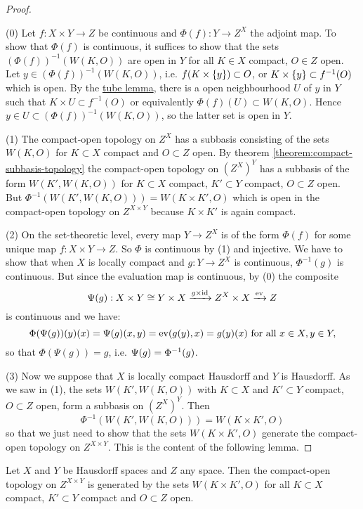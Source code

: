 \begin{proof}\ 

(0) Let $f:X\times Y\to Z$ be continuous and $\Phi(f):Y\to Z^X$ the adjoint map. To show that $\Phi(f)$ is continuous, it suffices to show that the sets $(\Phi(f))^{-1}(W(K,O))$ are open in $Y$ for all $K\in X$ compact, $O\in Z$ open. Let $y\in (\Phi(f))^{-1}(W(K,O))$, i.e. $f(K\times\{y\})\subset O$, or $K\times\{y\}\subset f^{-1}(O)$ which is open. By the \href{https://en.wikipedia.org/wiki/Tube_lemma}{tube lemma}, there is a open neighbourhood $U$ of $y$ in $Y$ such that $K\times U\subset f^{-1}(O)$ or equivalently $\Phi(f)(U)\subset W(K,O)$. Hence $y\in U\subset(\Phi(f))^{-1}(W(K,O))$, so the latter set is open in $Y$.

(1) The compact-open topology on $Z^X$ has a subbasis consisting of the sets $W(K,O)$ for $K\subset X$ compact and $O\subset Z$ open. By theorem \ref{theorem:compact-subbasis-topology} the compact-open topology on $(Z^X)^Y$ has a subbasis of the form $W(K',W(K,O))$ for $K\subset X$ compact, $K'\subset Y$ compact, $O\subset Z$ open. But $\Phi^{-1}(W(K',W(K,O)))=W(K\times K',O)$ which is open in the compact-open topology on $Z^{X\times Y}$ because $K\times K'$ is again compact.

(2) On the set-theoretic level, every map $Y\to Z^X$ is of the form $\Phi(f)$ for some unique map $f:X\times Y\to Z$. So $\Phi$ is continuous by (1) and injective. We have to show that when $X$ is locally compact and $g:Y\to Z^X$ is continuous, $\Phi^{-1}(g)$ is continuous. But since the evaluation map is continuous, by (0) the composite
\[\Psi(g):X\times Y\cong Y\times X\xrightarrow{g\times\operatorname{id}}Z^X\times X\xrightarrow{\operatorname{ev}}Z\]
is continuous and we have:
\[\Phi(\Psi(g))(y)(x)=\Psi(g)(x,y)=\operatorname{ev}(g(y),x)=g(y)(x)\text{ for all }x\in X,y\in Y,\]
so that $\Phi(\Psi(g))=g$, i.e. $\Psi(g)=\Phi^{-1}(g)$.

(3) Now we suppose that $X$ is locally compact Hausdorff and $Y$ is Hausdorff. As we saw in (1), the sets $W(K',W(K,O))$ with $K\subset X$ and $K'\subset Y$ compact, $O\subset Z$ open, form a subbasis on $(Z^X)^Y$. Then
\[\Phi^{-1}(W(K',W(K,O)))=W(K\times K',O)\]
so that we just need to show that the sets $W(K\times K',O)$ generate the compact-open topology on $Z^{X\times Y}$. This is the content of the following lemma.
\end{proof}

\begin{lemma}
Let $X$ and $Y$ be Hausdorff spaces and $Z$ any space. Then the compact-open topology on $Z^{X\times Y}$ is generated by the sets $W(K\times K',O)$ for all $K\subset X$ compact, $K'\subset Y$ compact and $O\subset Z$ open.
\end{lemma}

